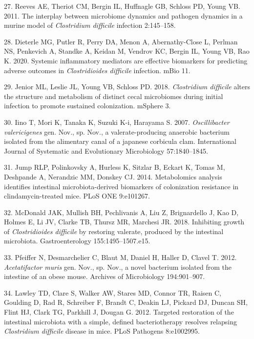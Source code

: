 \documentclass[
  11pt,
]{article}
\begin{document}
\leavevmode\hypertarget{ref-Reeves2011}{}%
27. Reeves AE, Theriot CM, Bergin IL, Huffnagle GB, Schloss PD, Young
VB. 2011. The interplay between microbiome dynamics and pathogen
dynamics in a murine model of \emph{Clostridium difficile} infection
2:145--158.

\leavevmode\hypertarget{ref-Dieterle2020}{}%
28. Dieterle MG, Putler R, Perry DA, Menon A, Abernathy-Close L, Perlman
NS, Penkevich A, Standke A, Keidan M, Vendrov KC, Bergin IL, Young VB,
Rao K. 2020. Systemic inflammatory mediators are effective biomarkers
for predicting adverse outcomes in \emph{Clostridioides difficile}
infection. mBio 11.

\leavevmode\hypertarget{ref-Jenior2018}{}%
29. Jenior ML, Leslie JL, Young VB, Schloss PD. 2018. \emph{Clostridium
difficile} alters the structure and metabolism of distinct cecal
microbiomes during initial infection to promote sustained colonization.
mSphere 3.

\leavevmode\hypertarget{ref-Iino2007}{}%
30. Iino T, Mori K, Tanaka K, Suzuki K-i, Harayama S. 2007.
\emph{Oscillibacter valericigenes} gen. Nov., sp. Nov., a
valerate-producing anaerobic bacterium isolated from the alimentary
canal of a japanese corbicula clam. International Journal of Systematic
and Evolutionary Microbiology 57:1840--1845.

\leavevmode\hypertarget{ref-Jump2014}{}%
31. Jump RLP, Polinkovsky A, Hurless K, Sitzlar B, Eckart K, Tomas M,
Deshpande A, Nerandzic MM, Donskey CJ. 2014. Metabolomics analysis
identifies intestinal microbiota-derived biomarkers of colonization
resistance in clindamycin-treated mice. PLoS ONE 9:e101267.

\leavevmode\hypertarget{ref-McDonald2018}{}%
32. McDonald JAK, Mullish BH, Pechlivanis A, Liu Z, Brignardello J, Kao
D, Holmes E, Li JV, Clarke TB, Thursz MR, Marchesi JR. 2018. Inhibiting
growth of \emph{Clostridioides difficile} by restoring valerate,
produced by the intestinal microbiota. Gastroenterology
155:1495--1507.e15.

\leavevmode\hypertarget{ref-Pfeiffer2012}{}%
33. Pfeiffer N, Desmarchelier C, Blaut M, Daniel H, Haller D, Clavel T.
2012. \emph{Acetatifactor muris} gen. Nov., sp. Nov., a novel bacterium
isolated from the intestine of an obese mouse. Archives of Microbiology
194:901--907.

\leavevmode\hypertarget{ref-Lawley2012}{}%
34. Lawley TD, Clare S, Walker AW, Stares MD, Connor TR, Raisen C,
Goulding D, Rad R, Schreiber F, Brandt C, Deakin LJ, Pickard DJ, Duncan
SH, Flint HJ, Clark TG, Parkhill J, Dougan G. 2012. Targeted restoration
of the intestinal microbiota with a simple, defined bacteriotherapy
resolves relapsing \emph{Clostridium difficile} disease in mice. PLoS
Pathogens 8:e1002995.
\end{document}
